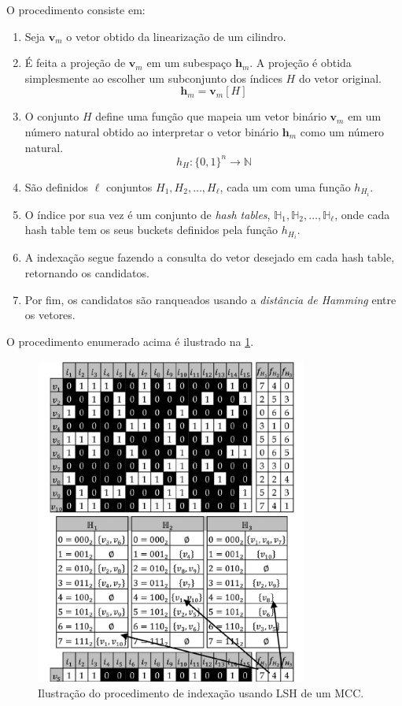 O procedimento consiste em:
\begin{enumerate}
    \item Seja $\mathbf{v}_m$ o vetor obtido da linearização de um cilindro.
    \item É feita a projeção de $\mathbf{v}_m$ em um subespaço $\mathbf{h}_m$. A projeção é obtida simplesmente ao escolher um subconjunto dos índices $H$ do vetor original.
    \begin{equation}
        \mathbf{h}_m = \mathbf{v}_m[H]
    \end{equation}
    \item O conjunto $H$ define uma função que mapeia um vetor binário $\mathbf{v}_m$ em um número natural obtido ao interpretar o vetor binário $\mathbf{h}_m$ como um número natural.
    \begin{equation}
        h_H: \{0, 1\}^n \rightarrow \mathbb{N}
    \end{equation}
    \item São definidos $\ell$ conjuntos $H_1, H_2, \ldots, H_\ell$, cada um com uma função $h_{H_i}$.
    \item O índice por sua vez é um conjunto de \textit{hash tables}, $\mathbb{H}_1, \mathbb{H}_2, \ldots, \mathbb{H}_\ell$, onde cada hash table tem os seus buckets definidos pela função $h_{H_i}$.
    \item A indexação segue fazendo a consulta do vetor desejado em cada hash table, retornando os candidatos.
    \item Por fim, os candidatos são ranqueados usando a \textit{distância de Hamming} entre os vetores.
\end{enumerate}

O procedimento enumerado acima é ilustrado na \cref{fig:lshmcc}.

\begin{figure}
    \centering
    \includegraphics[width=0.8\textwidth]{imgs/cylinder_lsh.png}
    \caption{Ilustração do procedimento de indexação usando LSH de um MCC.}
    \label{fig:lshmcc}
\end{figure}

\printbibliography